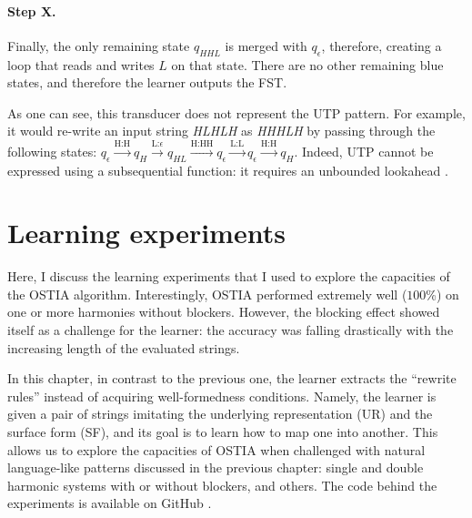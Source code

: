 \paragraph{Step X.}

Finally, the only remaining state $q_{HHL}$ is merged with $q_\epsilon$, therefore, creating a loop that reads and writes $L$ on that state.
There are no other remaining blue states, and therefore the learner outputs the FST.


\begin{center}
\end{center}

As one can see, this transducer does not represent the UTP pattern.
For example, it would re-write an input string \emph{HLHLH} as \emph{HHHLH} by passing through the following states: $q_{\epsilon}\xrightarrow{\text{H:H}}q_{H}\xrightarrow{\text{L:$\epsilon$}}q_{HL}\xrightarrow{\text{H:HH}}q_{\epsilon}\xrightarrow{\text{L:L}}q_{\epsilon}\xrightarrow{\text{H:H}}q_{H}$.
Indeed, UTP cannot be expressed using a subsequential function: it requires an unbounded lookahead \citep{Jardine2016}.


\section{Learning experiments}
\label{learningexperiments}

Here, I discuss the learning experiments that I used to explore the capacities of the OSTIA algorithm.
Interestingly, OSTIA performed extremely well ($100$\%) on one or more harmonies without blockers.
However, the blocking effect showed itself as a challenge for the learner: the accuracy was falling drastically with the increasing length of the evaluated strings.

In this chapter, in contrast to the previous one, the learner extracts the ``rewrite rules'' instead of acquiring well-formedness conditions.
Namely, the learner is given a pair of strings imitating the underlying representation (UR) and the surface form (SF), and its goal is to learn how to map one into another.
This allows us to explore the capacities of OSTIA when challenged with natural language-like patterns discussed in the previous chapter: single and double harmonic systems with or without blockers, and others.
The code behind the experiments is available on GitHub \href{https://github.com/alenaks/subregular-experiments}{\faGithub} \citep{GHsubex}.

